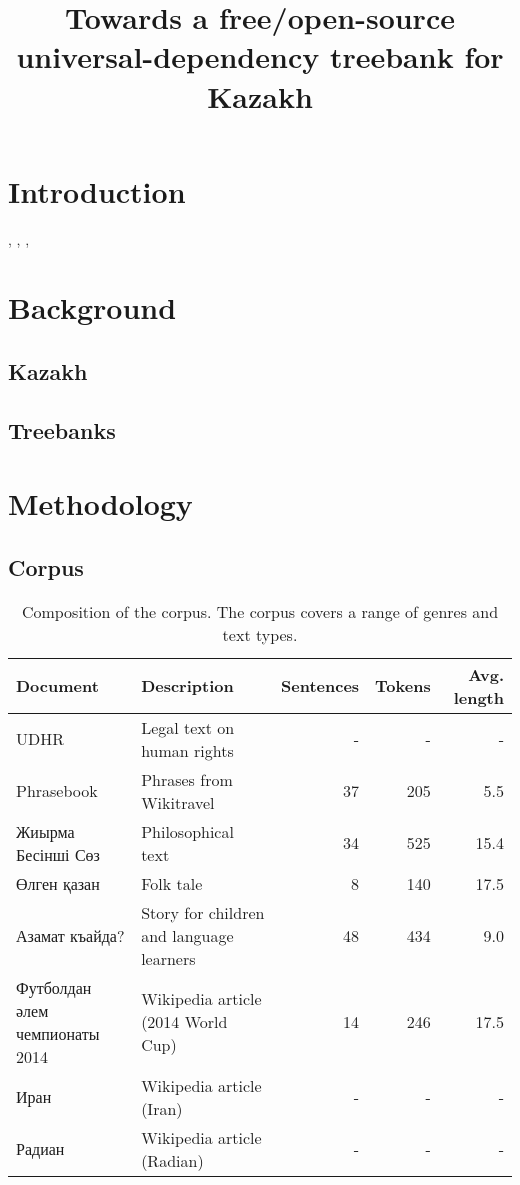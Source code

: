 \documentclass[a4paper,11pt, onecolumn]{article}
\title{Towards a free/open-source universal-dependency treebank for Kazakh}
\begin{document}
\maketitleabstract{}


\section{Introduction}

\citet{Lynn12}, \citet{Atalay03}, \citet{Oflazer03}, \citet{DeMarneffe14}

\section{Background}

\subsection{Kazakh}

\subsection{Treebanks} %

\section{Methodology}

\subsection{Corpus}

\begin{table}
  \centering
  \begin{tabular}{|l|l|r|r|r|}
    \hline
    \textbf{Document} & \textbf{Description} & \textbf{Sentences} & \textbf{Tokens} & \textbf{Avg. length}\\
    \hline
    UDHR & Legal text on human rights & - & - & - \\
    Phrasebook & Phrases from Wikitravel & 37 & 205 & 5.5 \\
    Жиырма Бесінші Сөз & Philosophical text & 34 & 525 & 15.4 \\ 
    Өлген қазан & Folk tale & 8 & 140 & 17.5 \\
    Азамат къайда? & Story for children and language learners & 48 & 434 & 9.0 \\
    Футболдан әлем чемпионаты 2014  & Wikipedia article (2014 World Cup) & 14 & 246 & 17.5 \\
    Иран & Wikipedia article (Iran) & - & - & - \\
    Радиан & Wikipedia article (Radian) & - & - & - \\
    \hline
  \end{tabular}
  \caption{Composition of the corpus. The corpus covers a range of genres and text types.}
\end{table}
\end{document}
